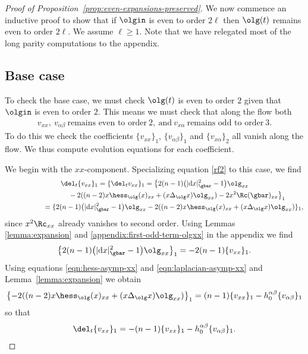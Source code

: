 \begin{proof}[Proof of Proposition~\ref{prop:even-expansions-preserved}]
We now commence an inductive proof to show that if $\olgin$ is even to order $2\ell$ then $\olg(t)$ remains even to order $2\ell$. We assume $\ell \geq 1$. Note that we have relegated most of the long parity computations to the appendix.

\subsection*{Base case}
To check the base case, we must check $\olg(t)$ is even to order $2$ given that $\olgin$ is even to order $2$. This means we must check that along the flow both
\begin{align*}
v_{xx}, \ v_{\alpha \beta}\ \mbox{remains even to order} \ 2, \ \mbox{and} \ v_{x\alpha} \ \mbox{remains odd to order} \ 3.
\end{align*}
To do this we check the coefficients $\{v_{xx}\}_1$, $\{v_{\alpha \beta}\}_1$ and $\{v_{x\alpha}\}_2$ all vanish along the flow. We thus compute evolution equations for each coefficient.

We begin with the $xx$-component. Specializing equation \eqref{rf2} to this case, we find
\begin{gather*}
\del_t \{ v_{xx} \}_{1} = \{ \del_t v_{xx}\}_{1}
 =\big\{ 2 (n-1) \big(|{\rm d}x|^2_{\gbar} -1\big) \olg_{xx} \\
 \hphantom{\del_t \{ v_{xx} \}_{1} =}{} -2 ( (n-2) x \hess_{\olg} (x)_{xx} + (x \Delta_{\olg} x) \olg_{xx} ) -2 x^2 \Rc(\gbar)_{xx}\big\}_1 \\
 \hphantom{\del_t \{ v_{xx} \}_{1}}{} =\{ 2 (n-1) \big(|{\rm d}x|^2_{\gbar} -1\big) \olg_{xx} -2 ( (n-2) x \hess_{\olg} (x)_{xx} + (x \Delta_{\olg} x) \olg_{xx} )\}_1,
\end{gather*}
since $x^2 \Rc_{xx}$ already vanishes to second order. Using Lemmas \ref{lemma:expansion} and \ref{appendix:first-odd-term-olgxx} in the appendix we find
\begin{gather*}
\big\{ 2 (n-1) \big(|{\rm d}x|^2_{\gbar} -1\big) \olg_{xx}\big\}_{1} = - 2(n-1) \{v_{xx}\}_1.
\end{gather*}
Using equations \eqref{eqn:hess-asymp-xx} and \eqref{eqn:laplacian-asymp-xx} and Lemma~\ref{lemma:expansion} we obtain
\begin{gather*}
\big\{{-}2 ( (n-2) x \hess_{\olg} (x)_{xx} + (x \Delta_{\olg} x) \olg_{xx} )\big\}_1 = (n-1) \{v_{xx}\}_1 - h_0^{\alpha \beta} \{v_{\alpha \beta}\}_{1}
\end{gather*}
so that
\begin{gather*}
\del_t \{ v_{xx} \}_{1} = -(n-1) \{v_{xx}\}_1 - h_0^{\alpha \beta} \{v_{\alpha \beta}\}_{1}.
\end{gather*}


\end{proof}
